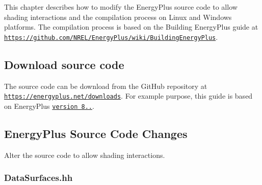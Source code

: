 

This chapter describes how to modify the Energy\+Plus source code to allow shading interactions and the compilation process on Linux and Windows platforms. The compilation process is based on the Building Energy\+Plus guide at \href{https://github.com/NREL/EnergyPlus/wiki/BuildingEnergyPlus}{\tt https\+://github.\+com/\+N\+R\+E\+L/\+Energy\+Plus/wiki/\+Building\+Energy\+Plus}.

 

\subsection*{Download source code}



The source code can be download from the Git\+Hub repository at \href{https://energyplus.net/downloads}{\tt https\+://energyplus.\+net/downloads}. For example purpose, this guide is based on Energy\+Plus \href{https://github.com/NREL/EnergyPlus/releases/tag/v8.6.0}{\tt version 8..}.

 

\subsection*{Energy\+Plus Source Code Changes}

 Alter the source code to allow shading interactions.

 

\subsubsection*{Data\+Surfaces.\+hh}




